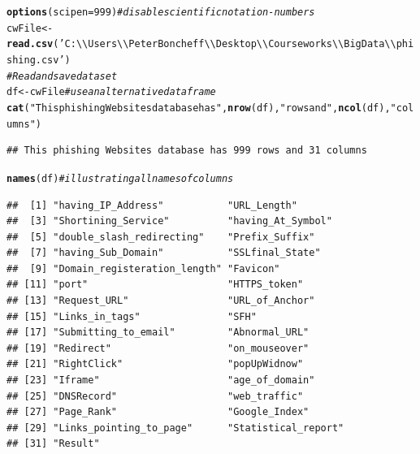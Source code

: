 \documentclass{article}\usepackage[]{graphicx}\usepackage[]{color}
\makeatletter
\newcommand{\hlnum}[1]{\textcolor[rgb]{0.686,0.059,0.569}{#1}}%
\newcommand{\hlstr}[1]{\textcolor[rgb]{0.192,0.494,0.8}{#1}}%
\newcommand{\hlcom}[1]{\textcolor[rgb]{0.678,0.584,0.686}{\textit{#1}}}%
\newcommand{\hlstd}[1]{\textcolor[rgb]{0.345,0.345,0.345}{#1}}%
\newcommand{\hlkwb}[1]{\textcolor[rgb]{0.69,0.353,0.396}{#1}}%
\newcommand{\hlkwc}[1]{\textcolor[rgb]{0.333,0.667,0.333}{#1}}%
\newcommand{\hlkwd}[1]{\textcolor[rgb]{0.737,0.353,0.396}{\textbf{#1}}}%
\newenvironment{kframe}{%
 \def\at@end@of@kframe{}%
 \ifinner\ifhmode%
  \def\at@end@of@kframe{\end{minipage}}%
  \begin{minipage}{\columnwidth}%
 \fi\fi%
 \def\FrameCommand##1{\hskip\@totalleftmargin \hskip-\fboxsep
 \colorbox{shadecolor}{##1}\hskip-\fboxsep
     \hskip-\linewidth \hskip-\@totalleftmargin \hskip\columnwidth}%
 \MakeFramed {\advance\hsize-\width
   \@totalleftmargin\z@ \linewidth\hsize
   \@setminipage}}%
 {\par\unskip\endMakeFramed%
 \at@end@of@kframe}
\newenvironment{knitrout}{}{} %
\makeatother
\begin{document}
\newline
\newline
\newline
\newline
\newline
\begin{knitrout}
\color{fgcolor}\begin{kframe}
\begin{alltt}
\hlkwd{options}\hlstd{(}\hlkwc{scipen} \hlstd{=} \hlnum{999}\hlstd{)} \hlcom{# disable scientific notation -numbers}
\hlstd{cwFile} \hlkwb{<-} \hlkwd{read.csv}\hlstd{(}\hlstr{'C:\textbackslash{}\textbackslash{}Users\textbackslash{}\textbackslash{}Peter Boncheff\textbackslash{}\textbackslash{}Desktop\textbackslash{}\textbackslash{}Courseworks\textbackslash{}\textbackslash{}Big Data\textbackslash{}\textbackslash{}phishing.csv'}\hlstd{)}
\hlcom{# Read and save dataset}
\hlstd{df} \hlkwb{<-} \hlstd{cwFile} \hlcom{# use an alternative data frame}
\hlkwd{cat}\hlstd{(}\hlstr{"This phishing Websites database has"}\hlstd{,} \hlkwd{nrow}\hlstd{(df),} \hlstr{"rows and"}\hlstd{,} \hlkwd{ncol}\hlstd{(df),} \hlstr{"columns"}\hlstd{)}
\end{alltt}
\begin{verbatim}
## This phishing Websites database has 999 rows and 31 columns
\end{verbatim}
\begin{alltt}
\hlkwd{names}\hlstd{(df)} \hlcom{# illustrating all names of columns}
\end{alltt}
\begin{verbatim}
##  [1] "having_IP_Address"           "URL_Length"                 
##  [3] "Shortining_Service"          "having_At_Symbol"           
##  [5] "double_slash_redirecting"    "Prefix_Suffix"              
##  [7] "having_Sub_Domain"           "SSLfinal_State"             
##  [9] "Domain_registeration_length" "Favicon"                    
## [11] "port"                        "HTTPS_token"                
## [13] "Request_URL"                 "URL_of_Anchor"              
## [15] "Links_in_tags"               "SFH"                        
## [17] "Submitting_to_email"         "Abnormal_URL"               
## [19] "Redirect"                    "on_mouseover"               
## [21] "RightClick"                  "popUpWidnow"                
## [23] "Iframe"                      "age_of_domain"              
## [25] "DNSRecord"                   "web_traffic"                
## [27] "Page_Rank"                   "Google_Index"               
## [29] "Links_pointing_to_page"      "Statistical_report"         
## [31] "Result"
\end{verbatim}
\end{kframe}
\end{knitrout}
\end{document}
